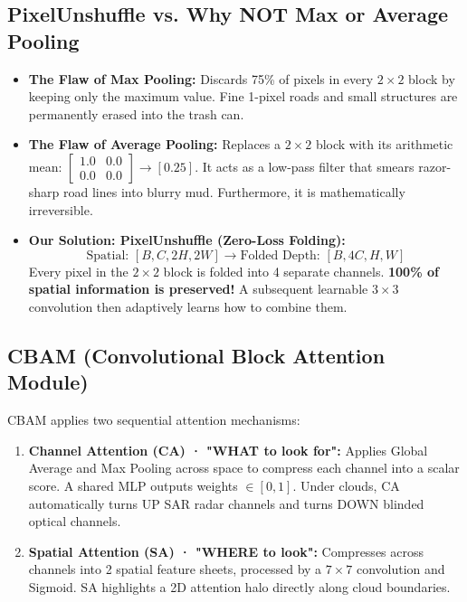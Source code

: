 \documentclass[11pt,a4paper]{article}
\begin{document}
\subsection{PixelUnshuffle vs. Why NOT Max or Average Pooling}
\begin{itemize}[leftmargin=1.5em]
    \item \textbf{The Flaw of Max Pooling:} Discards 75\% of pixels in every $2\times 2$ block by keeping only the maximum value. Fine 1-pixel roads and small structures are permanently erased into the trash can.
    \item \textbf{The Flaw of Average Pooling:} Replaces a $2\times 2$ block with its arithmetic mean: $\begin{bmatrix} 1.0 & 0.0 \\ 0.0 & 0.0 \end{bmatrix} \to [0.25]$. It acts as a low-pass filter that smears razor-sharp road lines into blurry mud. Furthermore, it is mathematically irreversible.
    \item \textbf{Our Solution: PixelUnshuffle (Zero-Loss Folding):}
    $$\text{Spatial: } [B, C, 2H, 2W] \longrightarrow \text{Folded Depth: } [B, 4C, H, W]$$
    Every pixel in the $2\times 2$ block is folded into 4 separate channels. \textbf{100\% of spatial information is preserved!} A subsequent learnable $3\times 3$ convolution then adaptively learns how to combine them.
\end{itemize}

\subsection{CBAM (Convolutional Block Attention Module)}
CBAM applies two sequential attention mechanisms:
\begin{enumerate}[leftmargin=1.5em]
    \item \textbf{Channel Attention (CA) · "WHAT to look for":} Applies Global Average and Max Pooling across space to compress each channel into a scalar score. A shared MLP outputs weights $\in [0, 1]$. Under clouds, CA automatically turns UP SAR radar channels and turns DOWN blinded optical channels.
    \item \textbf{Spatial Attention (SA) · "WHERE to look":} Compresses across channels into 2 spatial feature sheets, processed by a $7\times 7$ convolution and Sigmoid. SA highlights a 2D attention halo directly along cloud boundaries.
\end{enumerate}
\end{document}
